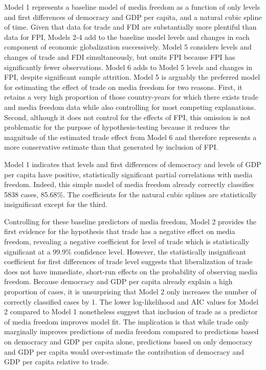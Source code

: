 \documentclass[12pt,a4paper]{article}\usepackage[]{graphicx}\usepackage[]{color}
\begin{document}
Model 1 represents a baseline model of media freedom as a function of only levels and first differences of democracy and GDP per capita, and a natural cubic spline of time. Given that data for trade and FDI are substantially more plentiful than data for FPI, Models 2-4 add to the baseline model levels and changes in each component of economic globalization successively. Model 5 considers levels and changes of trade and FDI simultaneously, but omits FPI because FPI has significantly fewer observations. Model 6 adds to Model 5 levels and changes in FPI, despite significant sample attrition. Model 5 is arguably the preferred model for estimating the effect of trade on media freedom for two reasons. First, it retains a very high proportion of those country-years for which there exists trade and media freedom data while also controlling for most competing explanations. Second, although it does not control for the effects of FPI, this omission is not problematic for the purpose of hypothesis-testing because it reduces the magnitude of the estimated trade effect from Model 6 and therefore represents a more conservative estimate than that generated by inclusion of FPI.

Model 1 indicates that levels and first differences of democracy and levels of GDP per capita have positive, statistically significant partial correlations with media freedom. Indeed, this simple model of media freedom already correctly classifies 5838 cases, 85.68\%. The coefficients for the natural cubic splines are statistically insignificant except for the third.

Controlling for these baseline predictors of media freedom, Model 2 provides the first evidence for the hypothesis that trade has a negative effect on media freedom, revealing a negative coefficient for level of trade which is statistically significant at a 99.9\% confidence level. However, the statistically insignificant coefficient for first differences of trade level suggests that liberalization of trade does not have immediate, short-run effects on the probability of observing media freedom. Because democracy and GDP per capita already explain a high proportion of cases, it is unsurprising that Model 2 only increases the number of correctly classified cases by 1. The lower log-likelihood and AIC values for Model 2 compared to Model 1 nonetheless suggest that inclusion of trade as a predictor of media freedom improves model fit. The implication is that while trade only marginally improves predictions of media freedom compared to predictions based on democracy and GDP per capita alone, predictions based on only democracy and GDP per capita would over-estimate the contribution of democracy and GDP per capita relative to trade.
\end{document}
